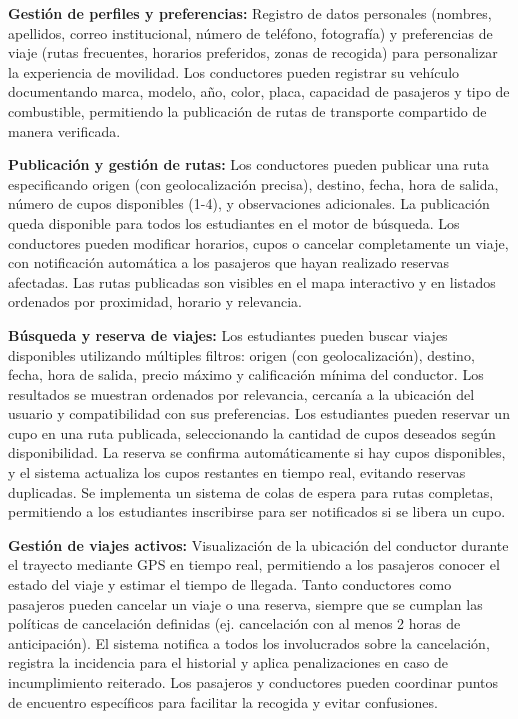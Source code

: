 \documentclass[11pt,a4paper]{article}
\begin{document}
\textbf{Gestión de perfiles y preferencias:} Registro de datos personales (nombres, apellidos, correo institucional, número de teléfono, fotografía) y preferencias de viaje (rutas frecuentes, horarios preferidos, zonas de recogida) para personalizar la experiencia de movilidad. Los conductores pueden registrar su vehículo documentando marca, modelo, año, color, placa, capacidad de pasajeros y tipo de combustible, permitiendo la publicación de rutas de transporte compartido de manera verificada.

\textbf{Publicación y gestión de rutas: }Los conductores pueden publicar una ruta especificando origen (con geolocalización precisa), destino, fecha, hora de salida, número de cupos disponibles (1-4), y observaciones adicionales. La publicación queda disponible para todos los estudiantes en el motor de búsqueda. Los conductores pueden modificar horarios, cupos o cancelar completamente un viaje, con notificación automática a los pasajeros que hayan realizado reservas afectadas. Las rutas publicadas son visibles en el mapa interactivo y en listados ordenados por proximidad, horario y relevancia.

\textbf{Búsqueda y reserva de viajes:} Los estudiantes pueden buscar viajes disponibles utilizando múltiples filtros: origen (con geolocalización), destino, fecha, hora de salida, precio máximo y calificación mínima del conductor. Los resultados se muestran ordenados por relevancia, cercanía a la ubicación del usuario y compatibilidad con sus preferencias. Los estudiantes pueden reservar un cupo en una ruta publicada, seleccionando la cantidad de cupos deseados según disponibilidad. La reserva se confirma automáticamente si hay cupos disponibles, y el sistema actualiza los cupos restantes en tiempo real, evitando reservas duplicadas. Se implementa un sistema de colas de espera para rutas completas, permitiendo a los estudiantes inscribirse para ser notificados si se libera un cupo.

\textbf{Gestión de viajes activos: }Visualización de la ubicación del conductor durante el trayecto mediante GPS en tiempo real, permitiendo a los pasajeros conocer el estado del viaje y estimar el tiempo de llegada. Tanto conductores como pasajeros pueden cancelar un viaje o una reserva, siempre que se cumplan las políticas de cancelación definidas (ej. cancelación con al menos 2 horas de anticipación). El sistema notifica a todos los involucrados sobre la cancelación, registra la incidencia para el historial y aplica penalizaciones en caso de incumplimiento reiterado. Los pasajeros y conductores pueden coordinar puntos de encuentro específicos para facilitar la recogida y evitar confusiones.
\end{document}
